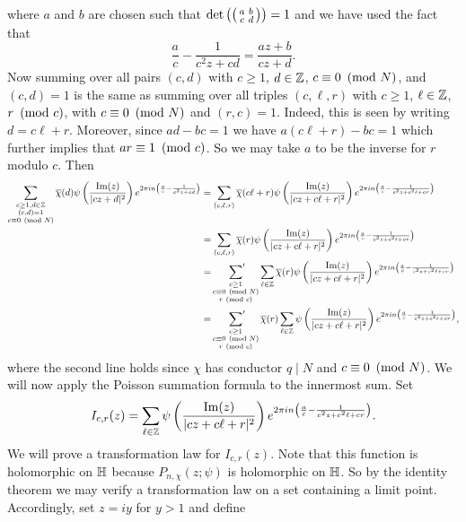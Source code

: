     where $a$ and $b$ are chosen such that $\det\left(\begin{psmallmatrix} a & b \\ c & d \end{psmallmatrix}\right) = 1$ and we have used the fact that
    \[
      \frac{a}{c}-\frac{1}{c^{2}z+cd} = \frac{az+b}{cz+d}.
    \]
    Now summing over all pairs $(c,d)$ with $c \ge 1$, $d \in \mathbb{Z}$, $c \equiv 0 \ \left(\text{mod }N\right)$, and $(c,d) = 1$ is the same as summing over all triples $(c,\ell,r)$ with $c \ge 1$, $\ell \in \mathbb{Z}$, $r \ \left(\text{mod }c\right)$, with $c \equiv 0 \ \left(\text{mod }N\right)$ and $(r,c) = 1$. Indeed, this is seen by writing $d = c\ell+r$. Moreover, since $ad-bc = 1$ we have $a(c\ell+r)-bc = 1$ which further implies that $ar \equiv 1 \ \left(\text{mod }c\right)$. So we may take $a$ to be the inverse for $r$ modulo $c$. Then
    \begin{align*}
      \sum_{\substack{c \ge 1,d \in \mathbb{Z} \\ (c,d) = 1 \\ c \equiv 0 \ \left(\text{mod }N\right)}}\overline{\chi}(d)\psi\left(\frac{\mathrm{Im}(z)}{|cz+d|^{2}}\right)e^{2\pi in\left(\frac{a}{c}-\frac{1}{c^{2}z+cd}\right)} &= \sum_{(c,\ell,r)}\overline{\chi}(c\ell+r)\psi\left(\frac{\mathrm{Im}(z)}{|cz+c\ell+r|^{2}}\right)e^{2\pi in\left(\frac{a}{c}-\frac{1}{c^{2}z+c^{2}\ell+cr}\right)} \\
      &= \sum_{(c,\ell,r)}\overline{\chi}(r)\psi\left(\frac{\mathrm{Im}(z)}{|cz+c\ell+r|^{2}}\right)e^{2\pi in\left(\frac{a}{c}-\frac{1}{c^{2}z+c^{2}\ell+cr}\right)} \\
      &= \sideset{}{'}\sum_{\substack{c \ge 1 \\ c \equiv 0 \ \left(\text{mod }N\right) \\ r \ \left(\text{mod }c\right)}}\sum_{\ell \in \mathbb{Z}}\overline{\chi}(r)\psi\left(\frac{\mathrm{Im}(z)}{|cz+c\ell+r|^{2}}\right)e^{2\pi in\left(\frac{a}{c}-\frac{1}{c^{2}z+c^{2}\ell+cr}\right)} \\
      &= \sideset{}{'}\sum_{\substack{c \ge 1 \\ c \equiv 0 \ \left(\text{mod }N\right) \\ r \ \left(\text{mod }c\right)}}\overline{\chi}(r)\sum_{\ell \in \mathbb{Z}}\psi\left(\frac{\mathrm{Im}(z)}{|cz+c\ell+r|^{2}}\right)e^{2\pi in\left(\frac{a}{c}-\frac{1}{c^{2}z+c^{2}\ell+cr}\right)},
    \end{align*}
    where the second line holds since $\chi$ has conductor $q \mid N$ and $c \equiv 0 \ \left(\text{mod }N\right)$. We will now apply the Poisson summation formula to the innermost sum. Set
    \[
      I_{c,r}(z) = \sum_{\ell \in \mathbb{Z}}\psi\left(\frac{\mathrm{Im}(z)}{|cz+c\ell+r|^{2}}\right)e^{2\pi in\left(\frac{a}{c}-\frac{1}{c^{2}z+c^{2}\ell+cr}\right)}.
    \]
    We will prove a transformation law for $I_{c,r}(z)$. Note that this function is holomorphic on $\mathbb{H}$ because $P_{n,\chi}(z;\psi)$ is holomorphic on $\mathbb{H}$. So by the identity theorem we may verify a transformation law on a set containing a limit point. Accordingly, set $z = iy$ for $y > 1$ and define
